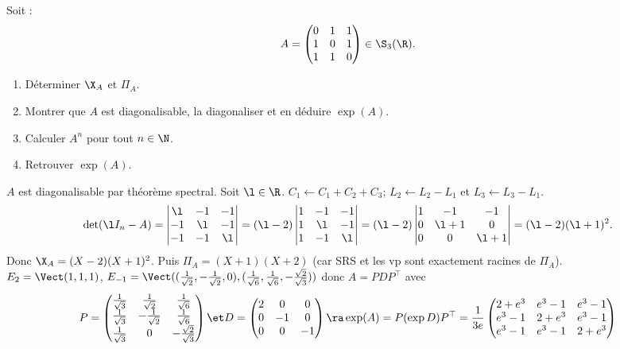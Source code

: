 \documentclass[11pt]{article}
\begin{document}
\begin{exercice}{}{}
    Soit :
    \begin{equation*}
        A=\begin{pmatrix}0&1&1\\1&0&1\\1&1&0\end{pmatrix} \in \S_3(\R).
    \end{equation*}
    \begin{enumerate}
        \item Déterminer $\X_A$ et $\Pi_A$.
        \item Montrer que $A$ est diagonalisable, la diagonaliser et en déduire $\exp(A)$.
        \item Calculer $A^n$ pour tout $n\in\N$.
        \item Retrouver $\exp(A)$.
    \end{enumerate}
    \tcblower
     $A$ est diagonalisable par théorème spectral. Soit $\l\in\R$. $C_1\gets C_1 + C_2 + C_3$; $L_2 \gets L_2 - L_1$ et $L_3\gets L_3 - L_1$.
    \begin{equation*}
        \det(\l I_n - A) = \begin{vmatrix} \l & -1 & -1 \\ -1 & \l & -1 \\ -1 & -1 & \l\end{vmatrix} = (\l-2)\begin{vmatrix}1 & -1 & -1 \\ 1 & \l & -1 \\ 1 & -1 & \l\end{vmatrix} = (\l-2)\begin{vmatrix}1&-1&-1\\0&\l+1&0\\0&0&\l+1\end{vmatrix}=(\l-2)(\l+1)^2.
    \end{equation*}
    Donc $\X_A = (X-2)(X+1)^2$. Puis $\Pi_A=(X+1)(X+2)$ (car SRS et les vp sont exactement racines de $\Pi_A$).\\
     $E_2=\Vect(1,1,1)$, $E_{-1}=\Vect((\frac{1}{\sqrt{2}}, -\frac{1}{\sqrt{2}}, 0), (\frac{1}{\sqrt{6}}, \frac{1}{\sqrt{6}}, -\frac{\sqrt{2}}{\sqrt{3}}))$ donc $A=PDP^\top$ avec \begin{equation*}P=\begin{pmatrix}\frac{1}{\sqrt{3}} & \frac{1}{\sqrt{2}} & \frac{1}{\sqrt{6}} \\ \frac{1}{\sqrt{3}} & -\frac{1}{\sqrt{2}} & \frac{1}{\sqrt{6}} \\ \frac{1}{\sqrt{3}} & 0 & -\frac{\sqrt{2}}{\sqrt{3}}\end{pmatrix} \et D=\begin{pmatrix}2&0&0\\0&-1&0\\0&0&-1\end{pmatrix} \ra \exp(A) = P(\exp D)P^\top = \frac{1}{3e}\begin{pmatrix}  2+e^3 & e^3-1 & e^3-1 \\ e^3-1 & 2+e^3 & e^3-1 \\ e^3-1 & e^3-1 & 2+e^3 \end{pmatrix}\end{equation*}

\end{exercice}
\end{document}
